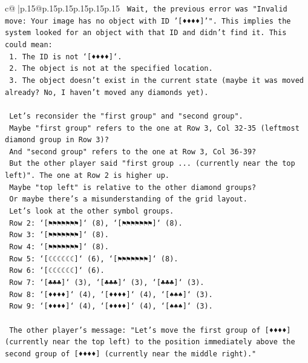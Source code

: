 \documentclass{article}
\begin{document}
{\begin{supertabular}{c@{$\;$}|p{.15\linewidth}@{}p{.15\linewidth}p{.15\linewidth}p{.15\linewidth}p{.15\linewidth}p{.15\linewidth}}
{{{\texttt{    Wait, the previous error was "Invalid move: Your image has no object with ID '{[}♦♦♦♦{]}'". This implies the system looked for an object with that ID and didn't find it. This could mean:} \\
\texttt{    1. The ID is not `{[}♦♦♦♦{]}`.} \\
\texttt{    2. The object is not at the specified location.} \\
\texttt{    3. The object doesn't exist in the current state (maybe it was moved already? No, I haven't moved any diamonds yet).} \\
\\ 
\texttt{    Let's reconsider the "first group" and "second group".} \\
\texttt{    Maybe "first group" refers to the one at Row 3, Col 32{-}35 (leftmost diamond group in Row 3)?} \\
\texttt{    And "second group" refers to the one at Row 3, Col 36{-}39?} \\
\texttt{    But the other player said "first group ... (currently near the top left)". The one at Row 2 is higher up.} \\
\texttt{    Maybe "top left" is relative to the other diamond groups?} \\
\texttt{    Or maybe there's a misunderstanding of the grid layout.} \\
\texttt{    Let's look at the other symbol groups.} \\
\texttt{    Row 2: `{[}⚑⚑⚑⚑⚑⚑⚑{]}` (8), `{[}⚑⚑⚑⚑⚑⚑⚑{]}` (8).} \\
\texttt{    Row 3: `{[}⚑⚑⚑⚑⚑⚑⚑{]}` (8).} \\
\texttt{    Row 4: `{[}⚑⚑⚑⚑⚑⚑⚑{]}` (8).} \\
\texttt{    Row 5: `{[}☾☾☾☾☾☾{]}` (6), `{[}⚑⚑⚑⚑⚑⚑⚑{]}` (8).} \\
\texttt{    Row 6: `{[}☾☾☾☾☾☾{]}` (6).} \\
\texttt{    Row 7: `{[}♣♣♣{]}` (3), `{[}♣♣♣{]}` (3), `{[}♣♣♣{]}` (3).} \\
\texttt{    Row 8: `{[}♦♦♦♦{]}` (4), `{[}♦♦♦♦{]}` (4), `{[}♠♠♠{]}` (3).} \\
\texttt{    Row 9: `{[}♦♦♦♦{]}` (4), `{[}♦♦♦♦{]}` (4), `{[}♠♠♠{]}` (3).} \\
\\ 
\texttt{    The other player's message: "Let's move the first group of {[}♦♦♦♦{]} (currently near the top left) to the position immediately above the second group of {[}♦♦♦♦{]} (currently near the middle right)."} \\
}}}
\end{supertabular}}
\end{document}
